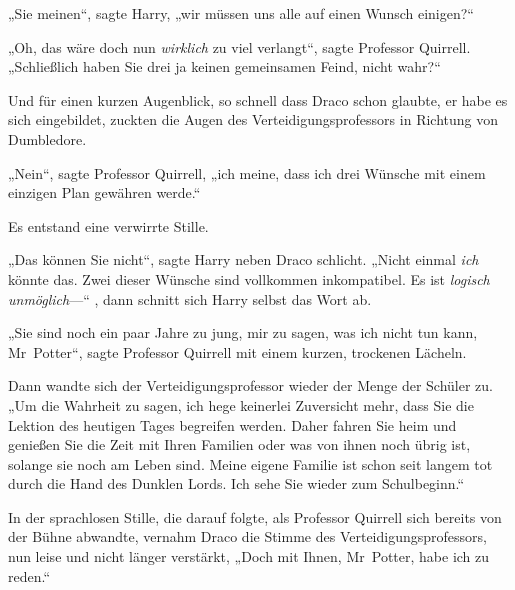 „Sie meinen“, sagte Harry, „wir müssen uns alle auf einen Wunsch einigen?“

„Oh, das wäre doch nun \emph{wirklich} zu viel verlangt“, sagte Professor Quirrell. „Schließlich haben Sie drei ja keinen gemeinsamen Feind, nicht wahr?“

Und für einen kurzen Augenblick, so schnell dass Draco schon glaubte, er habe es sich eingebildet, zuckten die Augen des Verteidigungsprofessors in Richtung von Dumbledore.

„Nein“, sagte Professor Quirrell, „ich meine, dass ich drei Wünsche mit einem einzigen Plan gewähren werde.“

Es entstand eine verwirrte Stille.

„Das können Sie nicht“, sagte Harry neben Draco schlicht. „Nicht einmal \emph{ich} könnte das. Zwei dieser Wünsche sind vollkommen inkompatibel. Es ist \emph{logisch unmöglich}—“ , dann schnitt sich Harry selbst das Wort ab.

„Sie sind noch ein paar Jahre zu jung, mir zu sagen, was ich nicht tun kann, Mr~Potter“, sagte Professor Quirrell mit einem kurzen, trockenen Lächeln.

Dann wandte sich der Verteidigungsprofessor wieder der Menge der Schüler zu. „Um die Wahrheit zu sagen, ich hege keinerlei Zuversicht mehr, dass Sie die Lektion des heutigen Tages begreifen werden. Daher fahren Sie heim und genießen Sie die Zeit mit Ihren Familien oder was von ihnen noch übrig ist, solange sie noch am Leben sind. Meine eigene Familie ist schon seit langem tot durch die Hand des Dunklen Lords. Ich sehe Sie wieder zum Schulbeginn.“

In der sprachlosen Stille, die darauf folgte, als Professor Quirrell sich bereits von der Bühne abwandte, vernahm Draco die Stimme des Verteidigungsprofessors, nun leise und nicht länger verstärkt, „Doch mit Ihnen, Mr~Potter, habe ich zu reden.“

